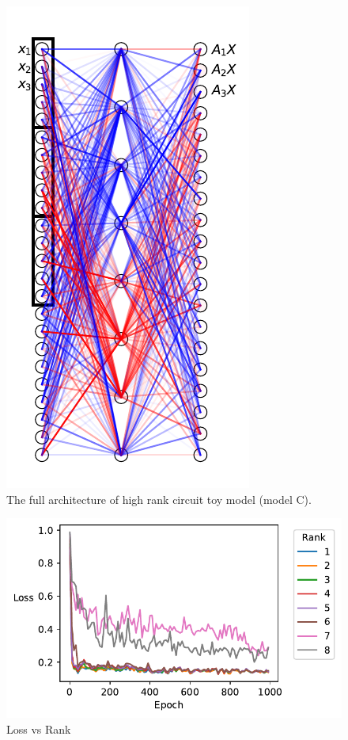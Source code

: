 \documentclass{article}
\theoremstyle{plain}
\theoremstyle{definition}
\theoremstyle{remark}
\begin{document}
\begin{figure}[ht]
    \centerline{\includegraphics{../figures/s1_high_rank_circuit_setup.pdf}}
    \centering
    \caption{The full architecture of high rank circuit toy model (model C).}\label{fig:s1_high_rank_circuit_setup}
\end{figure}


\begin{figure}[ht]
    \centerline{\includegraphics{../figures/s5_high_rank_circuits_loss_vs_rank.pdf}}
    \centering
    \caption{Loss vs Rank}\label{fig:s5_high_rank_circuits_loss_vs_rank}
\end{figure}
  
\end{document}
